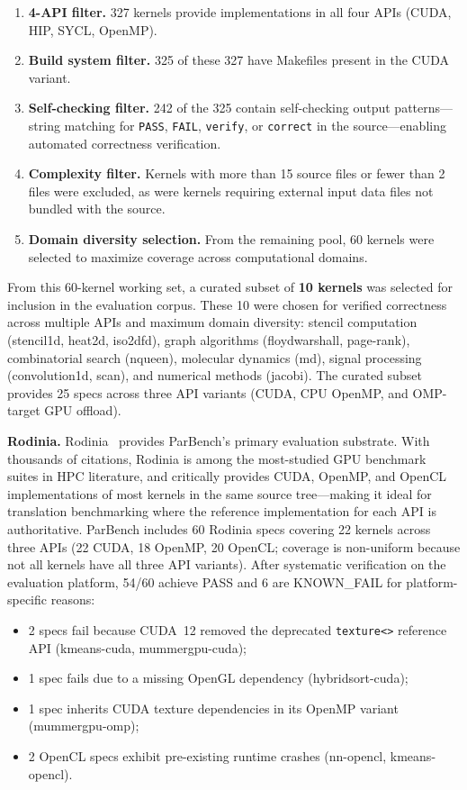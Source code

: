 \documentclass[conference]{IEEEtran}
\begin{document}
\begin{enumerate}
\item \textbf{4-API filter.} 327 kernels provide implementations in all four APIs (CUDA, HIP, SYCL, OpenMP).
\item \textbf{Build system filter.} 325 of these 327 have Makefiles present in the CUDA variant.
\item \textbf{Self-checking filter.} 242 of the 325 contain self-checking output patterns---string matching for \texttt{PASS}, \texttt{FAIL}, \texttt{verify}, or \texttt{correct} in the source---enabling automated correctness verification.
\item \textbf{Complexity filter.} Kernels with more than 15 source files or fewer than 2 files were excluded, as were kernels requiring external input data files not bundled with the source.
\item \textbf{Domain diversity selection.} From the remaining pool, 60 kernels were selected to maximize coverage across computational domains.
\end{enumerate}

From this 60-kernel working set, a curated subset of \textbf{10 kernels} was selected for inclusion in the evaluation corpus. These 10 were chosen for verified correctness across multiple APIs and maximum domain diversity: stencil computation (stencil1d, heat2d, iso2dfd), graph algorithms (floydwarshall, page-rank), combinatorial search (nqueen), molecular dynamics (md), signal processing (convolution1d, scan), and numerical methods (jacobi). The curated subset provides 25 specs across three API variants (CUDA, CPU OpenMP, and OMP-target GPU offload).

\textbf{Rodinia.} Rodinia~\cite{Rodinia2009} provides ParBench's primary evaluation substrate. With thousands of citations, Rodinia is among the most-studied GPU benchmark suites in HPC literature, and critically provides CUDA, OpenMP, and OpenCL implementations of most kernels in the same source tree---making it ideal for translation benchmarking where the reference implementation for each API is authoritative. ParBench includes 60 Rodinia specs covering 22 kernels across three APIs (22 CUDA, 18 OpenMP, 20 OpenCL; coverage is non-uniform because not all kernels have all three API variants). After systematic verification on the evaluation platform, 54/60 achieve PASS and 6 are KNOWN\_FAIL for platform-specific reasons:

\begin{itemize}
\item 2 specs fail because CUDA~12 removed the deprecated \texttt{texture<>} reference API (kmeans-cuda, mummergpu-cuda);
\item 1 spec fails due to a missing OpenGL dependency (hybridsort-cuda);
\item 1 spec inherits CUDA texture dependencies in its OpenMP variant (mummergpu-omp);
\item 2 OpenCL specs exhibit pre-existing runtime crashes (nn-opencl, kmeans-opencl).
\end{itemize}
\end{document}
